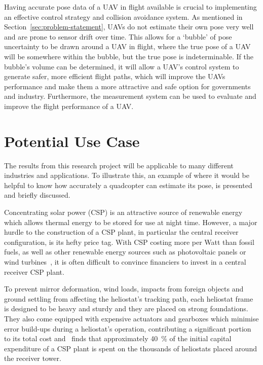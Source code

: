 Having accurate pose data of a UAV in flight available is crucial to implementing an effective control strategy and collision avoidance system. As mentioned in Section~\ref{sec:problem-statement}, UAVs do not estimate their own pose very well and are prone to sensor drift over time. This allows for a `bubble' of pose uncertainty to be drawn around a UAV in flight, where the true pose of a UAV will be somewhere within the bubble, but the true pose is indeterminable. If the bubble's volume can be determined, it will allow a UAV's control system to generate safer, more efficient flight paths, which will improve the UAVs performance and make them a more attractive and safe option for governments and industry. Furthermore, the measurement system can be used to evaluate and improve the flight performance of a UAV.\@ 

\section{Potential Use Case}

The results from this research project will be applicable to many different industries and applications. To illustrate this, an example of where it would be helpful to know how accurately a quadcopter can estimate its pose, is presented and briefly discussed. 

Concentrating solar power (CSP) is an attractive source of renewable energy which allows thermal energy to be stored for use at night time. However, a major hurdle to the construction of a CSP plant, in particular the central receiver configuration, is its hefty price tag. With CSP costing more per Watt than fossil fuels, as well as other renewable energy sources such as photovoltaic panels or wind turbines~\citep{irena-renewable_cost}, it is often difficult to convince financiers to invest in a central receiver CSP plant.

To prevent mirror deformation, wind loads, impacts from foreign objects and ground settling from affecting the heliostat's tracking path, each heliostat frame is designed to be heavy and sturdy and they are placed on strong foundations. They also come equipped with expensive actuators and gearboxes which minimise error build-ups during a heliostat's operation, contributing a significant portion to its total cost and~\cite{pitz2005ecostar} finds that approximately 40~\% of the initial capital expenditure of a CSP plant is spent on the thousands of heliostats placed around the receiver tower. 

